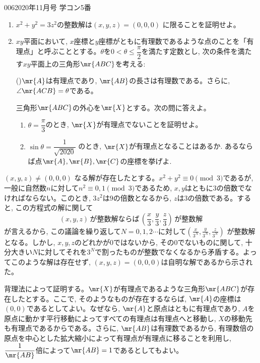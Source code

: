 \begin{prob}{006}{}{2020年11月号 学コン5番}
\begin{enumerate}
 \item $x^2 + y^2 = 3z^2$の整数解は$(x,y,z) = (0,0,0)$ に限ることを証明せよ。
 \item $xy$平面において, $x$座標と$y$座標がともに有理数であるような点のことを「有理点」と呼ぶこととする。$\theta$を$0< \theta \leq \dfrac{\pi}{2}$を満たす定数とし, 次の条件を満たす$xy$平面上の三角形$\mr{ABC}$を考える:
 \begin{center}
 ()\qquad $\mr{A}$は有理点であり, $\mr{AB}$の長さは有理数である。さらに, $\angle{\mr{ACB}} = \theta$である。
 \end{center}
 三角形$\mr{ABC}$の外心を$\mr{X}$とする。次の問に答えよ。
 \begin{enumerate}
  \item $\theta = \dfrac{\pi}{3}$のとき, $\mr{X}$が有理点でないことを証明せよ。
  \item $\sin{\theta}= \dfrac{1}{\sqrt{2020}}$ のとき, $\mr{X}$が有理点となることはあるか. あるならば点$\mr{A},\mr{B},\mr{C}$の座標を挙げよ.
 \end{enumerate}
\end{enumerate}
\end{prob}

$(x,y,z) \neq (0,0,0)$ なる解が存在したとする。$x^2 + y^2\equiv 0\pmod{3}$であるが, 一般に自然数$n$に対して$n^2\equiv 0,1\pmod{3}$であるため, $x,y$はともに$3$の倍数でなければならない。このとき, $3z^2$は$9$の倍数となるから, $z$は$3$の倍数である。すると, この方程式の解に関して
\[(x,y,z) \,\text{が整数解ならば} \,\left(\frac{x}{3}, \frac{y}{3}, \frac{z}{3}\right) \,\text{が整数解} \]
が言えるから, この議論を繰り返して$N=0,1,2\cdots$に対して$(\frac{x}{3^{N}}, \frac{y}{3^{N}}, \frac{z}{3^{N}})$ が整数解となる。しかし, $x,y,z$のどれかが$0$ではないから, その$0$でないものに関して, 十分大きい$N$に対してそれを$3^{N}$で割ったものが整数でなくなるから矛盾する。よってこのような解は存在せず, $(x,y,z) = (0,0,0)$は自明な解であるから示された。

背理法によって証明する。$\mr{X}$が有理点であるような三角形$\mr{ABC}$が存在したとする。ここで, そのようなものが存在するならば, $\mr{A}$の座標は$(0,0)$であるとしてよい。なぜなら, $\mr{A}$と原点はともに有理点であり, $A$を原点に動かす平行移動によってすべての有理点は有理点へと移動し, $X$の移動先も有理点であるからである。さらに, $\mr{AB}$は有理数であるから, 有理数倍の原点を中心とした拡大縮小によって有理点が有理点に移ることを利用し, $\dfrac{1}{\mr{AB}}$倍によって$\mr{AB}=1$であるとしてもよい。

